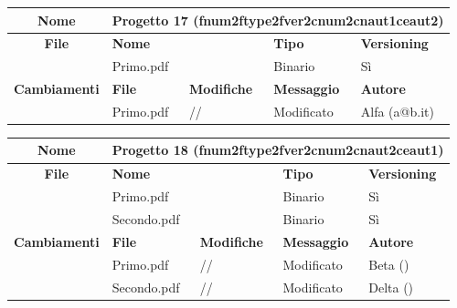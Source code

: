 \begin{table}[ht]
\footnotesize
\begin{tabular}{|c|p{2.5cm}|p{2cm}|p{2.5cm}|p{2.5cm}|}
  \hline
  \textbf{Nome}	& \multicolumn{4}{l|}{Progetto 17 (fnum2ftype2fver2cnum2cnaut1ceaut2)} 									\\
  \hline
  \rowcolor{lightgray}\textbf{File} 		& \multicolumn{2}{l|}{\textbf{Nome}}		& \textbf{Tipo}		& \textbf{Versioning} 		\\
						\cline{2-5}
						& \multicolumn{2}{l|}{Primo.pdf}		& Binario			& Sì				\\
  \hline
  \rowcolor{lightgray}\textbf{Cambiamenti}	& \textbf{File}		&\textbf{Modifiche}	& \textbf{Messaggio}	& \textbf{Autore}		\\
						\cline{2-5}
						& Primo.pdf		& //	  		& Modificato		& Alfa (a@b.it)			\\
						
  \hline
\end{tabular}
\end{table}

\begin{table}[ht]
\footnotesize
\begin{tabular}{|c|p{2.5cm}|p{2cm}|p{2.5cm}|p{2.5cm}|}
  \hline
  \textbf{Nome}	& \multicolumn{4}{l|}{Progetto 18 (fnum2ftype2fver2cnum2cnaut2ceaut1)} 									\\
  \hline
  \rowcolor{lightgray}\textbf{File} 		& \multicolumn{2}{l|}{\textbf{Nome}}		& \textbf{Tipo}		& \textbf{Versioning} 		\\
						\cline{2-5}
						& \multicolumn{2}{l|}{Primo.pdf}		& Binario			& Sì				\\
						\cline{2-5}
						& \multicolumn{2}{l|}{Secondo.pdf}		& Binario			& Sì				\\
  \hline
  \rowcolor{lightgray}\textbf{Cambiamenti}	& \textbf{File}		&\textbf{Modifiche}	& \textbf{Messaggio}	& \textbf{Autore}		\\
						\cline{2-5}
						& Primo.pdf		& //	  		& Modificato		& Beta ()			\\
						\cline{2-5}
						& Secondo.pdf		& //	  		& Modificato		& Delta ()			\\
  \hline
\end{tabular}
\end{table}

